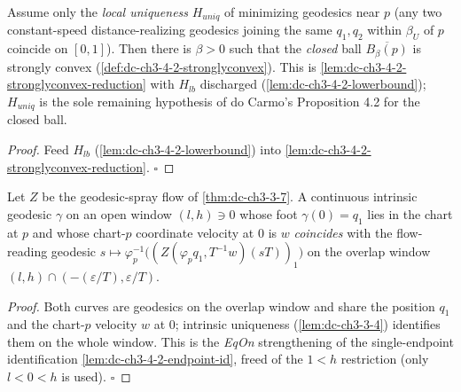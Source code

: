 \begin{lemma}
  \label{lem:dc-ch3-4-2-stronglyconvex-uniq}
  \leanok
  Assume only the \emph{local uniqueness} $H_{uniq}$ of minimizing geodesics near $p$ (any two
  constant-speed distance-realizing geodesics joining the same $q_1,q_2$ within $\beta_U$ of $p$
  coincide on $[0,1]$). Then there is $\beta>0$ such that the \emph{closed} ball
  $\overline{B_\beta(p)}$ is strongly convex (\cref{def:dc-ch3-4-2-stronglyconvex}). This is
  \cref{lem:dc-ch3-4-2-stronglyconvex-reduction} with $H_{lb}$ discharged
  (\cref{lem:dc-ch3-4-2-lowerbound}); $H_{uniq}$ is the sole remaining hypothesis of do Carmo's
  Proposition 4.2 for the closed ball.
\end{lemma}
\begin{proof}
  \leanok
  Feed $H_{lb}$ (\cref{lem:dc-ch3-4-2-lowerbound}) into
  \cref{lem:dc-ch3-4-2-stronglyconvex-reduction}. $\square$
\end{proof}

\begin{lemma}
  \label{lem:dc-ch3-4-2-eqon-flow-reading}
  \leanok
  Let $Z$ be the geodesic-spray flow of \cref{thm:dc-ch3-3-7}. A continuous intrinsic geodesic
  $\gamma$ on an open window $(l,h)\ni0$ whose foot $\gamma(0)=q_1$ lies in the chart at $p$ and whose
  chart-$p$ coordinate velocity at $0$ is $w$ \emph{coincides} with the flow-reading geodesic
  $s\mapsto\varphi_p^{-1}\bigl((Z(\varphi_p q_1,T^{-1}w)(sT))_1\bigr)$ on the overlap window
  $(l,h)\cap(-(\varepsilon/T),\varepsilon/T)$.
\end{lemma}
\begin{proof}
  \leanok
  Both curves are geodesics on the overlap window and share the position $q_1$ and the chart-$p$
  velocity $w$ at $0$; intrinsic uniqueness (\cref{lem:dc-ch3-3-4}) identifies them on the whole
  window. This is the \emph{EqOn} strengthening of the single-endpoint identification
  \cref{lem:dc-ch3-4-2-endpoint-id}, freed of the $1<h$ restriction (only $l<0<h$ is used). $\square$
\end{proof}

